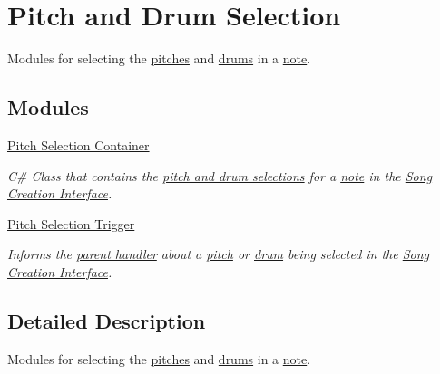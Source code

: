 \hypertarget{group___doc_s_c___p_d_s}{}\section{Pitch and Drum Selection}
\label{group___doc_s_c___p_d_s}


Modules for selecting the \hyperlink{group___music_enums_ga508f69b199ea518f935486c990edac1d}{pitches} and \hyperlink{group___music_enums_gade475b4382c7066d1af13e7c13c029b6}{drums} in a \hyperlink{group___music_structs_struct_music_1_1_combined_note}{note}.  


\subsection*{Modules}
\begin{DoxyCompactItemize}
\item 
\hyperlink{group___doc_s_c___p_s_c}{Pitch Selection Container}
\begin{DoxyCompactList}\small\item\em C\# Class that contains the \hyperlink{group___doc_s_c___p_s_t}{pitch and drum selections} for a \hyperlink{group___music_structs_struct_music_1_1_combined_note}{note} in the \hyperlink{group___doc_s_c}{Song Creation Interface}. \end{DoxyCompactList}\item 
\hyperlink{group___doc_s_c___p_s_t}{Pitch Selection Trigger}
\begin{DoxyCompactList}\small\item\em Informs the \hyperlink{group___doc_s_c___p_s_c}{parent handler} about a \hyperlink{group___music_enums_ga508f69b199ea518f935486c990edac1d}{pitch} or \hyperlink{group___music_enums_gade475b4382c7066d1af13e7c13c029b6}{drum} being selected in the \hyperlink{group___doc_s_c}{Song Creation Interface}. \end{DoxyCompactList}\end{DoxyCompactItemize}


\subsection{Detailed Description}
Modules for selecting the \hyperlink{group___music_enums_ga508f69b199ea518f935486c990edac1d}{pitches} and \hyperlink{group___music_enums_gade475b4382c7066d1af13e7c13c029b6}{drums} in a \hyperlink{group___music_structs_struct_music_1_1_combined_note}{note}. 


